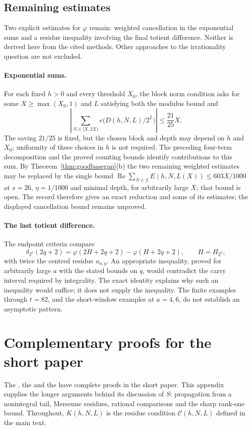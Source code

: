 \subsection{Remaining estimates}

Two explicit estimates for $\varphi$ remain: weighted cancellation
in the exponential sums and a residue inequality involving the final
totient difference. Neither is derived here from the cited methods.
Other approaches to the irrationality question are not excluded.



\paragraph{Exponential sums.} For each fixed $h>0$ and every
threshold $X_0$, the block norm condition asks for some $X\ge\max(X_0,1)$
and $L$ satisfying both the modulus bound and
\[
 \left|\sum_{N\in[X,2X)}e\bigl(D(h,N,L)/2^L\bigr)\right|
       \le\frac{21}{25}X.
\]
The saving $21/25$ is fixed, but the chosen block and depth may depend
on $h$ and $X_0$; uniformity of these choices in $h$ is not required.
The preceding four-term decomposition and the proved counting bounds
identify contributions to this sum. By
Theorem~\ref{thm:goodbasegap}(b) the two remaining weighted estimates may
be replaced by the single bound
$\operatorname{Re}\sum_{N\in\mathcal G}E(h,N,L(X))\le603X/1000$ at
$s=26$, $\eta=1/1000$ and minimal depth, for arbitrarily large $X$; that
bound is open. The record therefore gives an exact reduction and some of
its estimates; the displayed cancellation bound remains unproved.

\paragraph{The last totient difference.} The endpoint criteria compare
\[
 \delta_{2^a}(2q+2)
   =\varphi(2H+2q+2)-\varphi(H+2q+2),\qquad H=H_{2^a},
\]
with twice the centred residue $u_{a,q}$. An appropriate inequality,
proved for arbitrarily large $a$ with the stated bounds on $q$, would
contradict the carry interval required by integrality. The exact identity
explains why such an inequality would suffice; it does not supply the
inequality. The finite examples through $t=82$, and the short-window
examples at $a=4,6$, do not establish an asymptotic pattern.


\clearpage
\appendix
\section{Complementary proofs for the short paper}\label{app:r3-complements}
The , the
 and the
 have complete
proofs in the short paper. This appendix supplies the longer arguments
behind its discussion of $S$: propagation from a nonintegral tail,
Mersenne residues, rational comparisons and the sharp rank-one bound.
Throughout, $K(h,N,L)$ is the residue condition
$\mathcal C(h,N,L)$ defined in the main text.

